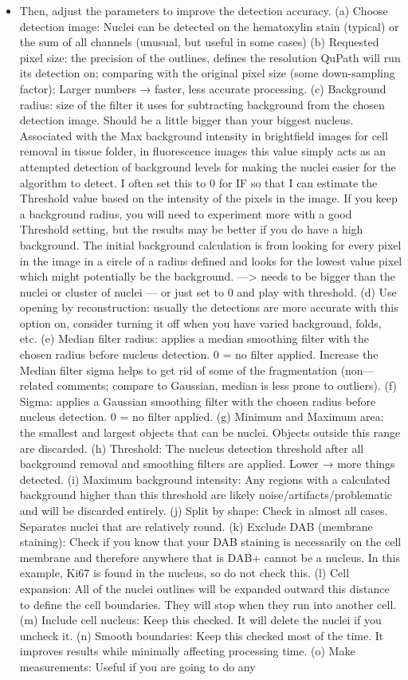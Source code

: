 \documentclass[a4paper,12pt]{article}
\begin{document}
\begin{enumerate}
\begin{itemize}
    \item Then, adjust the parameters to improve the detection accuracy. (a)	Choose detection image:  Nuclei can be detected on the hematoxylin stain (typical) or the sum of all channels (unusual, but useful in some cases) (b) Requested pixel size: the precision of the outlines, defines the resolution QuPath will run its detection on; comparing with the original pixel size (some down-sampling factor); Larger numbers → faster, less accurate processing. (c) Background radius: size of the filter it uses for subtracting background from the chosen detection image. Should be a little bigger than your biggest nucleus. Associated with the Max background intensity in brightfield images for cell removal in tissue folder, in fluorescence images this value simply acts as an attempted detection of background levels for making the nuclei easier for the algorithm to detect. I often set this to 0 for IF so that I can estimate the Threshold value based on the intensity of the pixels in the image. If you keep a background radius, you will need to experiment more with a good Threshold setting, but the results may be better if you do have a high background. The initial background calculation is from looking for every pixel in the image in a circle of a radius defined and looks for the lowest value pixel which might potentially be the background. —> needs to be bigger than the nuclei or cluster of nuclei — or just set to 0 and play with threshold. (d) Use opening by reconstruction: usually the detections are more accurate with this option on, consider turning it off when you have varied background, folds, etc. (e) Median filter radius: applies a median smoothing filter with the chosen radius before nucleus detection. 0 = no filter applied. Increase the Median filter sigma helps to get rid of some of the fragmentation (non—related comments; compare to Gaussian, median is less prone to outliers). (f) Sigma: applies a Gaussian smoothing filter with the chosen radius before nucleus detection. 0 = no filter applied. (g) Minimum and Maximum area: the smallest and largest objects that can be nuclei. Objects outside this range are discarded. (h) Threshold: The nucleus detection threshold after all background removal and smoothing filters are applied. Lower → more things detected. (i) Maximum background intensity: Any regions with a calculated background higher than this threshold are likely noise/artifacts/problematic and will be discarded entirely. (j) Split by shape: Check in almost all cases. Separates nuclei that are relatively round. (k) Exclude DAB (membrane staining): Check if you know that your DAB staining is necessarily on the cell membrane and therefore anywhere that is DAB+ cannot be a nucleus. In this example, Ki67 is found in the nucleus, so do not check this. (l) Cell expansion: All of the nuclei outlines will be expanded outward this distance to define the cell boundaries. They will stop when they run into another cell. (m) Include cell nucleus:  Keep this checked. It will delete the nuclei if you uncheck it. (n) Smooth boundaries: Keep this checked most of the time. It improves results while minimally affecting processing time. (o) Make measurements: Useful if you are going to do any 
\end{itemize}
\end{enumerate}
\end{document}
